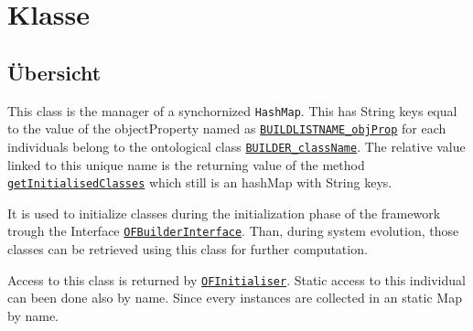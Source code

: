
\section[OFBuildedListInvoker]{Klasse }\label{ontologyFramework.OFRunning.OFInvokingManager.OFBuildedListInvoker-class}
\subsection{Übersicht}
This class is the manager of a synchornized \texttt{HashMap}. This has String keys
 equal to the value of the objectProperty named as \texttt{\hyperlink{ontologyFramework.OFRunning.OFInitialising.OFBuilderCommon.BUILDLISTNAME_objProp}{BUILDLISTNAME_objProp}}
 for each individuals belong to the ontological class \texttt{\hyperlink{ontologyFramework.OFRunning.OFInitialising.OFInitialiser.BUILDER_className}{BUILDER_className}}. The 
 relative value linked to this unique name is the returning value of the method \texttt{\hyperlink{ontologyFramework.OFRunning.OFInitialising.OFBuilderInterface.getInitialisedClasses()}{getInitialisedClasses}}
 which still is an hashMap with String keys.
 \par 
 It is used to initialize classes during the initialization phase of the framework trough the 
 Interface \texttt{\hyperlink{ontologyFramework.OFRunning.OFInitialising.OFBuilderInterface<T>-class}{OFBuilderInterface}}. Than, during system evolution, those classes can be 
 retrieved using this class for further computation.
 \par 
 Access to this class is returned by \texttt{\hyperlink{ontologyFramework.OFRunning.OFInitialising.OFInitialiser-class}{OFInitialiser}}. Static access to this 
 individual can been done also by name. Since every instances are collected in an 
 static Map by name.
 
